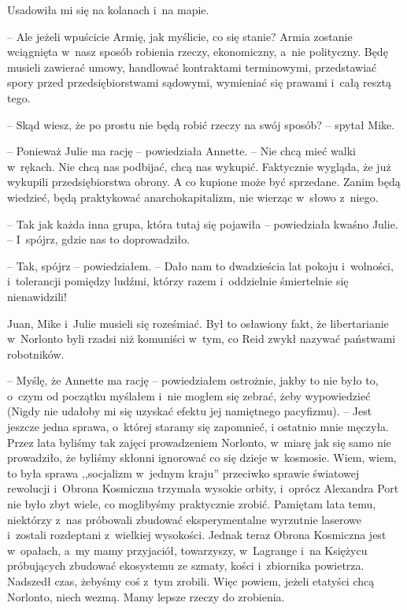 \documentclass[oneside,polish,11pt,sfheadings]{mwbk}
\begin{document}
Usadowiła mi się na kolanach i~na mapie. 

-- Ale jeżeli wpuścicie Armię,
jak myślicie, co się stanie? Armia zostanie wciągnięta w~nasz sposób
robienia rzeczy, ekonomiczny, a~nie polityczny. Będę musieli zawierać
umowy, handlować kontraktami terminowymi, przedstawiać spory przed
przedsiębiorstwami sądowymi, wymieniać się prawami i~całą resztą tego.

-- Skąd wiesz, że po prostu nie będą robić rzeczy na swój sposób? -- spytał Mike.

-- Ponieważ Julie ma rację -- powiedziała Annette. -- Nie chcą mieć walki w~rękach. Nie chcą nas podbijać, chcą nas wykupić. Faktycznie wygląda, że
już wykupili przedsiębiorstwa obrony. A co kupione może być sprzedane.
Zanim będą wiedzieć, będą praktykować anarchokapitalizm, nie wierząc w~słowo z~niego.

-- Tak jak każda inna grupa, która tutaj się pojawiła -- powiedziała
kwaśno Julie. -- I~spójrz, gdzie nas to doprowadziło.

-- Tak, spójrz -- powiedziałem. -- Dało nam to dwadzieścia lat pokoju i~wolności, i~tolerancji pomiędzy ludźmi, którzy razem i~oddzielnie
śmiertelnie się nienawidzili!

Juan, Mike i~Julie musieli się roześmiać. Był to osławiony fakt, że
libertarianie w~Norlonto byli rzadsi niż komuniści w~tym, co Reid zwykł
nazywać państwami robotników.

-- Myślę, że Annette ma rację -- powiedziałem ostrożnie, jakby to nie było
to, o~czym od początku myślałem i~nie mogłem się zebrać, żeby
wypowiedzieć (Nigdy nie udałoby mi się uzyskać efektu jej namiętnego
pacyfizmu). -- Jest jeszcze jedna sprawa, o~której staramy się zapomnieć,
i ostatnio mnie męczyła. Przez lata byliśmy tak zajęci prowadzeniem
Norlonto, w~miarę jak się samo nie prowadziło, że byliśmy skłonni
ignorować co się dzieje w~kosmosie. Wiem, wiem, to była sprawa
,,socjalizm w~jednym kraju'' przeciwko sprawie światowej rewolucji i~Obrona Kosmiczna trzymała wysokie orbity, i~oprócz Alexandra Port nie
było zbyt wiele, co moglibyśmy praktycznie zrobić. Pamiętam lata temu,
niektórzy z~nas próbowali zbudować eksperymentalne wyrzutnie laserowe i~zostali rozdeptani z~wielkiej wysokości. Jednak teraz Obrona Kosmiczna
jest w~opałach, a~my mamy przyjaciół, towarzyszy, w~Lagrange i~na
Księżycu próbujących zbudować ekosystemu ze szmaty, kości i~zbiornika
powietrza. Nadszedł czas, żebyśmy coś z~tym zrobili. Więc powiem, jeżeli
etatyści chcą Norlonto, niech wezmą. Mamy lepsze rzeczy do zrobienia.
\end{document}
